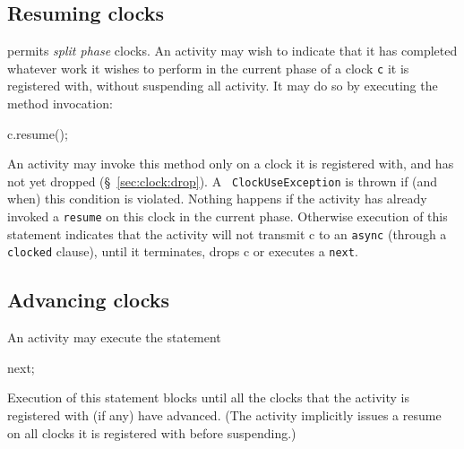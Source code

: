 \subsection{Resuming clocks}\label{resume}\label{sec:clock:resume}
\Xten{} permits {\em split phase} clocks. An activity may wish
to indicate that it has completed whatever work it wishes to perform
in the current phase of a  clock {\tt c} it is registered with, without
suspending all activity. It may do so  by executing the method
invocation:
\begin{x10}
  c.resume();
\end{x10}

An activity may invoke this method only on a clock it is registered
with, and has not yet dropped (\S~\ref{sec:clock:drop}). A {\tt
ClockUseException} is thrown if (and
when) this condition is violated.  Nothing happens if the activity has
already invoked a {\tt resume} on this clock in the current phase.
Otherwise execution of this statement indicates that the activity will
not transmit {\cf c} to an {\tt async} (through a {\tt clocked}
clause),
until it terminates, drops {\cf c} or executes a {\tt next}. 


\subsection{Advancing clocks}\label{sec:clock:next}
An activity may execute the statement
\begin{x10}
  next;
\end{x10}

\noindent 
Execution of this statement blocks until all the clocks that the
activity is registered with (if any) have advanced. (The activity
implicitly issues a {\cf resume} on all clocks it is registered
with before suspending.)


